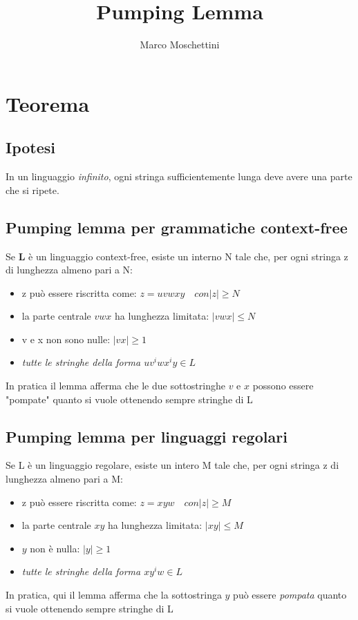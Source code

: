 \documentclass[a4paper]{report}
\title{Pumping Lemma}
\author{Marco Moschettini}
\begin{document}
\maketitle

\chapter{Teorema}
\section{Ipotesi}
In un linguaggio \textit{infinito}, ogni stringa sufficientemente lunga deve avere una parte che si ripete.

\section{Pumping lemma per grammatiche context-free}
Se \textbf{L} è un linguaggio context-free, esiste un interno N tale che, per ogni stringa z di lunghezza almeno pari a N:
\begin{itemize}
\item z può essere riscritta come: \( z = uvwxy \quad con \left | z \right | \ge N \)
\item la parte centrale \(vwx\) ha lunghezza limitata: \(\left | vwx \right | \le N\)
\item v e x non sono nulle: \( \left | vx \right | \ge 1\)
\item \emph{tutte le stringhe della forma \(uv^iwx^iy \in L\)}
\end{itemize}
In pratica il lemma afferma che le due sottostringhe \(v\) e \(x\) possono essere "pompate" quanto si vuole ottenendo sempre stringhe di L

\section{Pumping lemma per linguaggi regolari}
Se L è un linguaggio regolare, esiste un intero M tale che, per ogni stringa z di lunghezza almeno pari a M:
\begin{itemize}
\item z può essere riscritta come: \(z = xyw \quad con \left | z \right | \geq M\)
\item la parte centrale \(xy\) ha lunghezza limitata: \( \left | xy \right | \leq M\)
\item \(y\) non è nulla: \(\left | y \right | \ge 1\)
\item \emph{tutte le stringhe della forma \(xy^iw \in L\)}
\end{itemize}
In pratica, qui il lemma afferma che la sottostringa \(y\) può essere \emph{pompata} quanto si vuole ottenendo sempre stringhe di L 
\end{document}
